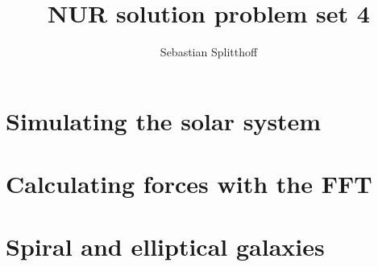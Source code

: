 \documentclass[a4paper,10pt]{article}
\title{NUR solution problem set 4}
\author{Sebastian Splitthoff}
\begin{document}
\maketitle

\section{Simulating the solar system}





\section{Calculating forces with the FFT}





\section{Spiral and elliptical galaxies}


\end{document}
